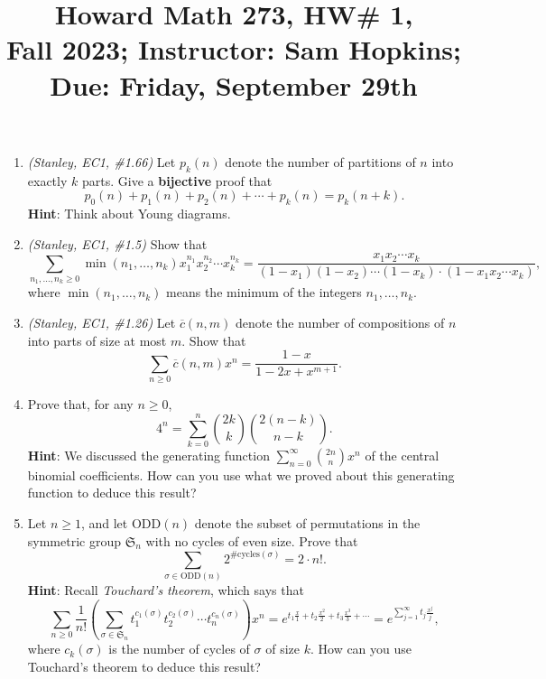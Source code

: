 \documentclass[11pt]{article}
\title{Howard Math 273, HW\# 1, \\ {\normalsize Fall 2023; Instructor: Sam Hopkins; Due: Friday, September 29th}}
\date{}
\begin{document}
\maketitle

\thispagestyle{empty}


\begin{enumerate}

\item \emph{(Stanley, EC1, \#1.66)} Let $p_k(n)$ denote the number of partitions of $n$ into exactly $k$ parts. Give a {\bf bijective} proof that
\[p_0(n)+p_1(n)+p_2(n)+\cdots + p_k(n) = p_k(n+k).\]
{\bf Hint}: Think about Young diagrams.

\item \emph{(Stanley, EC1, \#1.5)} Show that 
\[ \sum_{n_1,\ldots, n_k \geq 0} \min(n_1,\ldots,n_k) x_1^{n_1}x_2^{n_2}\cdots x_k^{n_k} = \frac{x_1x_2\cdots x_k}{(1-x_1)(1-x_2)\cdots(1-x_k) \cdot (1-x_1x_2\cdots x_k)}, \]
where $ \min(n_1,\ldots,n_k)$ means the minimum of the integers $n_1,\ldots,n_k$.

\item \emph{(Stanley, EC1, \#1.26)} Let $\overline{c}(n,m)$ denote the number of compositions of $n$ into parts of size at most $m$. Show that
\[ \sum_{n\geq 0} \overline{c}(n,m)x^n = \frac{1-x}{1-2x+x^{m+1}}.\]

\item Prove that, for any $n \geq 0$,
\[ 4^n = \sum_{k=0}^{n} \binom{2k}{k}\binom{2(n-k)}{n-k}. \]
{\bf Hint}: We discussed the generating function $\sum_{n=0}^{\infty} \binom{2n}{n}x^n$ of the central binomial coefficients. How can you use what we proved about this generating function to deduce this result?

\item Let $n \geq 1$, and let $\mathrm{ODD}(n)$ denote the subset of permutations in the symmetric group $\mathfrak{S}_n$ with no cycles of even size. Prove that
\[ \sum_{\sigma \in \mathrm{ODD}(n)} 2^{\#\mathrm{cycles}(\sigma)} = 2\cdot n!. \]
{\bf Hint}: Recall \emph{Touchard's theorem}, which says that
\[ \sum_{n \geq 0} \frac{1}{n!} \left(\sum_{\sigma\in \mathfrak{S}_n}t_1^{c_1(\sigma)} t_2^{c_2(\sigma)} \cdots t_n^{c_n(\sigma)} \right)  x^n = e^{t_1\frac{x}{1} + t_2\frac{x^2}{2} + t_3\frac{x^3}{3}+\cdots} = e^{\sum_{j=1}^{\infty} t_j\frac{x^j}{j}},\]
where $c_k(\sigma)$ is the number of cycles of $\sigma$ of size $k$. How can you use Touchard's theorem to deduce this result?


\end{enumerate}
\end{document}

